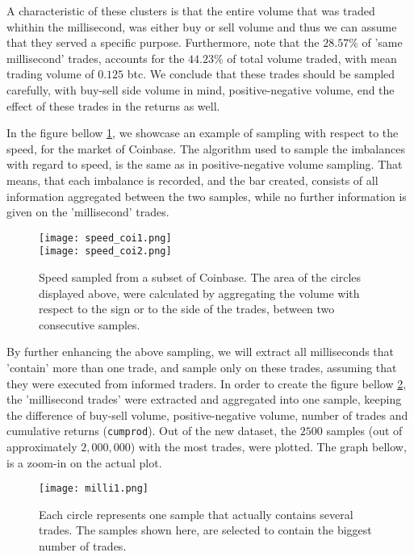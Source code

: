 A characteristic of these clusters is that the entire volume that was traded whithin the millisecond, was either buy or sell volume and thus we can assume that they served a specific purpose. Furthermore, note that the \(28.57\%\) of 'same millisecond' trades, accounts for the \(44.23\%\) of total volume traded, with mean trading volume of \(0.125\) btc. We conclude that these trades should be sampled carefully, with buy-sell side volume in mind, positive-negative volume, end the effect of these trades in the returns as well.

In the figure bellow \ref{fig:speed_coi}, we showcase an example of sampling with respect to the speed, for the market of Coinbase. The algorithm used to sample the imbalances with regard to speed, is the same as in positive-negative volume sampling. That means, that each imbalance is recorded, and the bar created, consists of all information aggregated between the two samples, while no further information is given on the 'millisecond' trades.

\begin{figure}[H]
	\centering
    \texttt{[image: speed\_coi1.png]} \\
    \texttt{[image: speed\_coi2.png]}
	\caption{Speed sampled from a subset of Coinbase. The area of the circles displayed above, were calculated by aggregating the volume with respect to the sign or to the side of the trades, between two consecutive samples.}
    \label{fig:speed_coi}
\end{figure}

By further enhancing the above sampling, we will extract all milliseconds that 'contain' more than one trade, and sample only on these trades, assuming that they were executed from informed traders. In order to create the figure bellow \ref{fig:milli1}, the 'millisecond trades' were extracted and aggregated into one sample, keeping the difference of buy-sell volume, positive-negative volume, number of trades and cumulative returns (\texttt{cumprod}). Out of the new dataset, the \(2500\) samples (out of approximately \(2,000,000\)) with the most trades, were plotted. The graph bellow, is a zoom-in on the actual plot.

\begin{figure}[H]
	\centering
    \texttt{[image: milli1.png]}
	\caption{Each circle represents one sample that actually contains several trades. The samples shown here, are selected to contain the biggest number of trades.}
    \label{fig:milli1}
\end{figure}



